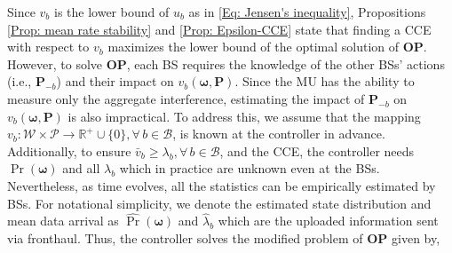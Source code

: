 \documentclass[conference]{IEEEtran}
\begin{document}
Since $v_b$ is the lower bound of $u_b$ as in \eqref{Eq: Jensen's inequality}, Propositions  \ref{Prop: mean rate stability} and \ref{Prop: Epsilon-CCE} state that finding a CCE with respect to $v_b$ maximizes the lower bound of the optimal solution of {\bf OP}.
%
%		
However, to solve {\bf OP}, each BS requires the knowledge of the other BSs' actions (i.e., $\mathbf{P}_{-b}$) and their impact on $v_b(\boldsymbol{\omega},\mathbf{P})$.
Since the MU has the ability to measure only the aggregate interference, estimating the impact of $\mathbf{P}_{-b}$ on $v_b(\boldsymbol{\omega},\mathbf{P})$  is also impractical. To address this, we assume that the mapping $v_{b}:\mathcal{W}\times\mathcal{P}\to\mathbb{R}^{+}\cup \{0\},\forall\,b\in\mathcal{B}$,  is known at the controller in advance.
Additionally, to ensure $\bar{v}_b\geq \lambda_{b},\forall\,b\in\mathcal{B}$, and the CCE, the controller needs $\Pr(\boldsymbol{\omega})$ and all $\lambda_{b}$ which in practice are unknown  even at the BSs.
Nevertheless, as time evolves, all the statistics can be empirically estimated by BSs.
For notational simplicity, we denote the estimated state distribution and mean data arrival as  $\hat{\Pr}(\boldsymbol{\omega})$ and $\hat{\lambda}_{b}$
which are the uploaded information sent via fronthaul.
Thus, the controller solves the modified problem of {\bf OP} given by,
%
%
%
\end{document}
